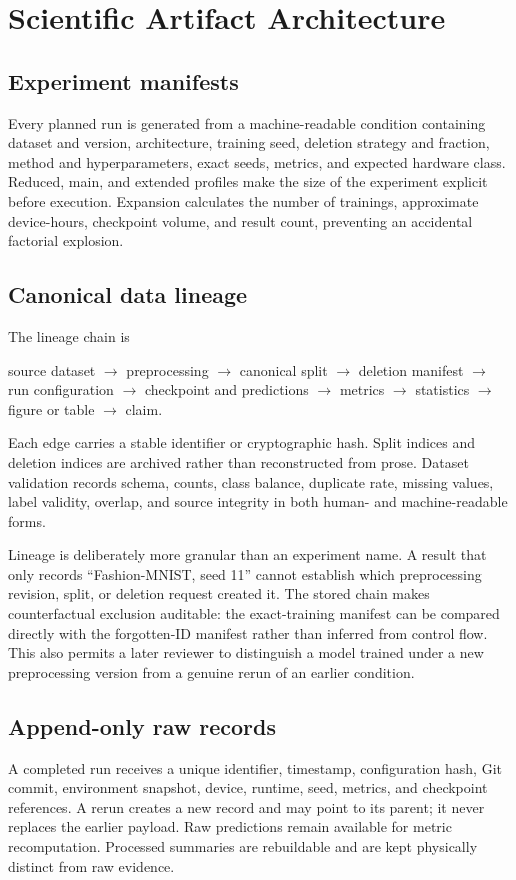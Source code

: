 \section{Scientific Artifact Architecture}
\subsection{Experiment manifests}
Every planned run is generated from a machine-readable condition containing dataset and
version, architecture, training seed, deletion strategy and fraction, method and
hyperparameters, exact seeds, metrics, and expected hardware class.  Reduced, main, and
extended profiles make the size of the experiment explicit before execution.  Expansion
calculates the number of trainings, approximate device-hours, checkpoint volume, and result
count, preventing an accidental factorial explosion.

\subsection{Canonical data lineage}
The lineage chain is
\begin{center}
source dataset $\rightarrow$ preprocessing $\rightarrow$ canonical split
$\rightarrow$ deletion manifest $\rightarrow$ run configuration
$\rightarrow$ checkpoint and predictions $\rightarrow$ metrics
$\rightarrow$ statistics $\rightarrow$ figure or table $\rightarrow$ claim.
\end{center}
Each edge carries a stable identifier or cryptographic hash.  Split indices and deletion
indices are archived rather than reconstructed from prose.  Dataset validation records
schema, counts, class balance, duplicate rate, missing values, label validity, overlap, and
source integrity in both human- and machine-readable forms.

Lineage is deliberately more granular than an experiment name. A result that only records
``Fashion-MNIST, seed 11'' cannot establish which preprocessing revision, split, or
deletion request created it. The stored chain makes counterfactual exclusion auditable:
the exact-training manifest can be compared directly with the forgotten-ID manifest rather
than inferred from control flow. This also permits a later reviewer to distinguish a model
trained under a new preprocessing version from a genuine rerun of an earlier condition.

\subsection{Append-only raw records}
A completed run receives a unique identifier, timestamp, configuration hash, Git commit,
environment snapshot, device, runtime, seed, metrics, and checkpoint references.  A rerun
creates a new record and may point to its parent; it never replaces the earlier payload.
Raw predictions remain available for metric recomputation.  Processed summaries are
rebuildable and are kept physically distinct from raw evidence.

